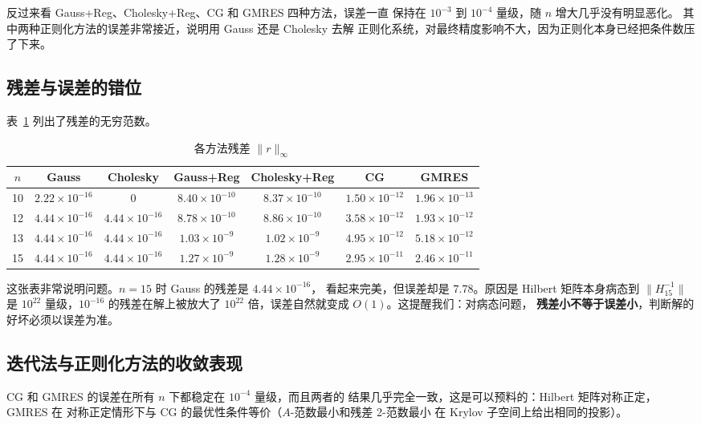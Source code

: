 \documentclass[UTF8]{ctexart}
\begin{document}
反过来看 Gauss+Reg、Cholesky+Reg、CG 和 GMRES 四种方法，误差一直
保持在 $10^{-3}$ 到 $10^{-4}$ 量级，随 $n$ 增大几乎没有明显恶化。
其中两种正则化方法的误差非常接近，说明用 Gauss 还是 Cholesky 去解
正则化系统，对最终精度影响不大，因为正则化本身已经把条件数压了下来。

\subsection{残差与误差的错位}

表~\ref{tab:res} 列出了残差的无穷范数。

\begin{table}[H]
\centering
\small
\caption{各方法残差 $\|r\|_\infty$}
\label{tab:res}
\begin{tabular}{c|cccccc}
\toprule
$n$ & Gauss & Cholesky & Gauss+Reg & Cholesky+Reg & CG & GMRES \\
\midrule
10 & $2.22\times 10^{-16}$ & $0$ & $8.40\times 10^{-10}$ & $8.37\times 10^{-10}$ & $1.50\times 10^{-12}$ & $1.96\times 10^{-13}$ \\
12 & $4.44\times 10^{-16}$ & $4.44\times 10^{-16}$ & $8.78\times 10^{-10}$ & $8.86\times 10^{-10}$ & $3.58\times 10^{-12}$ & $1.93\times 10^{-12}$ \\
13 & $4.44\times 10^{-16}$ & $4.44\times 10^{-16}$ & $1.03\times 10^{-9}$ & $1.02\times 10^{-9}$ & $4.95\times 10^{-12}$ & $5.18\times 10^{-12}$ \\
15 & $4.44\times 10^{-16}$ & $4.44\times 10^{-16}$ & $1.27\times 10^{-9}$ & $1.28\times 10^{-9}$ & $2.95\times 10^{-11}$ & $2.46\times 10^{-11}$ \\
\bottomrule
\end{tabular}
\end{table}

这张表非常说明问题。$n=15$ 时 Gauss 的残差是 $4.44\times 10^{-16}$，
看起来完美，但误差却是 $7.78$。原因是 Hilbert 矩阵本身病态到
$\|H_{15}^{-1}\|$ 是 $10^{22}$ 量级，$10^{-16}$ 的残差在解上被放大了
$10^{22}$ 倍，误差自然就变成 $O(1)$。这提醒我们：对病态问题，
\textbf{残差小不等于误差小}，判断解的好坏必须以误差为准。

\subsection{迭代法与正则化方法的收敛表现}

CG 和 GMRES 的误差在所有 $n$ 下都稳定在 $10^{-4}$ 量级，而且两者的
结果几乎完全一致，这是可以预料的：Hilbert 矩阵对称正定，GMRES 在
对称正定情形下与 CG 的最优性条件等价（$A$-范数最小和残差 2-范数最小
在 Krylov 子空间上给出相同的投影）。
\end{document}
